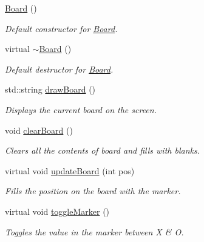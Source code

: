 \begin{DoxyCompactItemize}
\item 
\mbox{\label{classBoard_a9ee491d4fea680cf69b033374a9fdfcb}} 
\mbox{\hyperlink{classBoard_a9ee491d4fea680cf69b033374a9fdfcb}{Board}} ()
\begin{DoxyCompactList}\small\item\em Default constructor for \mbox{\hyperlink{classBoard}{Board}}. \end{DoxyCompactList}\item 
\mbox{\label{classBoard_af73f45730119a1fd8f6670f53f959e68}} 
virtual \mbox{\hyperlink{classBoard_af73f45730119a1fd8f6670f53f959e68}{$\sim$\+Board}} ()
\begin{DoxyCompactList}\small\item\em Default destructor for \mbox{\hyperlink{classBoard}{Board}}. \end{DoxyCompactList}\item 
std\+::string \mbox{\hyperlink{classBoard_a8fb1cd277d1dd029baeda80ec8e65756}{draw\+Board}} ()
\begin{DoxyCompactList}\small\item\em Displays the current board on the screen. \end{DoxyCompactList}\item 
\mbox{\label{classBoard_a5f148daa03da25d40dff3fc613568d6f}} 
void \mbox{\hyperlink{classBoard_a5f148daa03da25d40dff3fc613568d6f}{clear\+Board}} ()
\begin{DoxyCompactList}\small\item\em Clears all the contents of board and fills with blanks. \end{DoxyCompactList}\item 
virtual void \mbox{\hyperlink{classBoard_a44d5f45daeec9a19d48d17aa02601a17}{update\+Board}} (int pos)
\begin{DoxyCompactList}\small\item\em Fills the position on the board with the marker. \end{DoxyCompactList}\item 
\mbox{\label{classBoard_aca803d96c721292cedaf21b2ac5fb1a8}} 
virtual void \mbox{\hyperlink{classBoard_aca803d96c721292cedaf21b2ac5fb1a8}{toggle\+Marker}} ()
\begin{DoxyCompactList}\small\item\em Toggles the value in the marker between \textquotesingle{}X\textquotesingle{} \& \textquotesingle{}O\textquotesingle{}. \end{DoxyCompactList}\item 

\end{DoxyCompactItemize}
